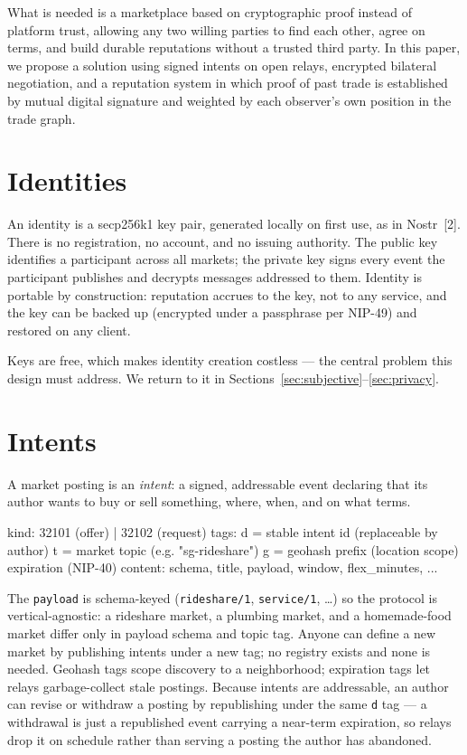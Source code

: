 \documentclass[11pt]{article}
\begin{document}
What is needed is a marketplace based on cryptographic proof instead of
platform trust, allowing any two willing parties to find each other, agree
on terms, and build durable reputations without a trusted third party. In
this paper, we propose a solution using signed intents on open relays,
encrypted bilateral negotiation, and a reputation system in which proof of
past trade is established by mutual digital signature and weighted by each
observer's own position in the trade graph.

\section{Identities}

An identity is a secp256k1 key pair, generated locally on first use, as in
Nostr~[2]. There is no registration, no account, and no issuing authority.
The public key identifies a participant across all markets; the private key
signs every event the participant publishes and decrypts messages addressed
to them. Identity is portable by construction: reputation accrues to the
key, not to any service, and the key can be backed up (encrypted under a
passphrase per NIP-49) and restored on any client.

Keys are free, which makes identity creation costless --- the central
problem this design must address. We return to it in
Sections~\ref{sec:subjective}--\ref{sec:privacy}.

\section{Intents}

A market posting is an \emph{intent}: a signed, addressable event declaring
that its author wants to buy or sell something, where, when, and on what
terms.

\begin{code}
kind:  32101 (offer) | 32102 (request)
tags:  d = stable intent id          (replaceable by author)
       t = market topic              (e.g. "sg-rideshare")
       g = geohash prefix            (location scope)
       expiration                    (NIP-40)
content: { schema, title, payload, window, flex_minutes, ... }
\end{code}

The \texttt{payload} is schema-keyed (\texttt{rideshare/1},
\texttt{service/1}, \dots) so the protocol is vertical-agnostic: a rideshare
market, a plumbing market, and a homemade-food market differ only in payload
schema and topic tag. Anyone can define a new market by publishing intents
under a new tag; no registry exists and none is needed. Geohash tags scope
discovery to a neighborhood; expiration tags let relays garbage-collect
stale postings. Because intents are addressable, an author can revise or
withdraw a posting by republishing under the same \texttt{d} tag --- a
withdrawal is just a republished event carrying a near-term expiration, so
relays drop it on schedule rather than serving a posting the author has
abandoned.
\end{document}

